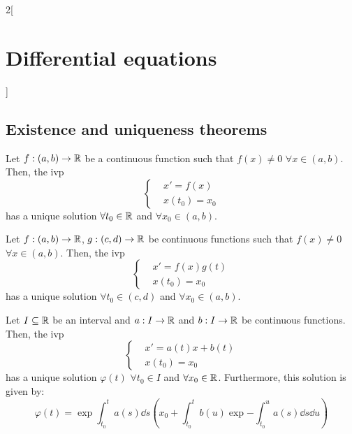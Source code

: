 \documentclass[../../../main.tex]{subfiles}
\begin{document}
\begin{multicols}{2}[\section{Differential equations}]
  \subsection{Existence and uniqueness theorems}
  \begin{prop}
    Let $f:(a,b)\rightarrow\mathbb{R}$ be a continuous function such that $f(x)\ne 0$ $\forall x\in(a,b)$. Then, the ivp
    $$
      \left\{
      \begin{aligned}
         & x'      =f(x) \\
         & x(t_0)  =x_0
      \end{aligned}
      \right.
    $$
    has a unique solution $\forall t_0\in\mathbb{R}$ and $\forall x_0\in(a,b)$.
  \end{prop}
  \begin{prop}
    Let $f:(a,b)\rightarrow\mathbb{R}$, $g:(c,d)\rightarrow\mathbb{R}$ be continuous functions such that $f(x)\ne 0$ $\forall x\in(a,b)$. Then, the ivp
    $$\left\{
      \begin{aligned}
         & x'      =f(x)g(t) \\
         & x(t_0)  =x_0
      \end{aligned}
      \right.$$
    has a unique solution $\forall t_0\in(c,d)$ and $\forall x_0\in(a,b)$.
  \end{prop}
  \begin{prop}
    Let $I\subseteq\mathbb{R}$ be an interval and $a:I\rightarrow\mathbb{R}$ and $b:I\rightarrow\mathbb{R}$ be continuous functions. Then, the ivp
    $$\left\{
      \begin{aligned}
         & x'      =a(t)x+b(t) \\
         & x(t_0)  =x_0
      \end{aligned}
      \right.$$
    has a unique solution $\varphi(t)$ $\forall t_0\in I$ and $\forall x_0\in\mathbb{R}$. Furthermore, this solution is given by:
    $$\varphi(t)=\exp{\int_{t_0}^ta(s)\dd s}\left(x_0+\int_{t_0}^tb(u)\exp{-\int_{t_0}^ua(s)\dd s}\dd u\right)$$
  \end{prop}

\end{multicols}
\end{document}
